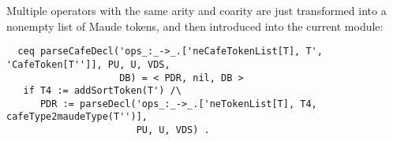 Multiple operators with the same arity and coarity are just transformed into a nonempty
list of Maude tokens, and then introduced into the current module:

{\codesize
\begin{verbatim}
  ceq parseCafeDecl('ops_:_->_.['neCafeTokenList[T], T', 'CafeToken[T'']], PU, U, VDS,
                    DB) = < PDR, nil, DB >
   if T4 := addSortToken(T') /\
      PDR := parseDecl('ops_:_->_.['neTokenList[T], T4, cafeType2maudeType(T'')],
                       PU, U, VDS) .
\end{verbatim}
}

{\codesize
\begin{comment}
  ceq parseCafeDecl('ops_:`->_`{_`}.['neCafeTokenList[T], 'CafeToken[T''], T'''],  PU, U,
                    VDS, DB) = < PDR, nil, DB >
   if PDR := parseDecl('ops_:`->_`[_`].['neTokenList[T], cafeType2maudeType(T''),
                                        map2MaudeAttr(T''')], PU, U, VDS) .

  ceq parseCafeDecl('ops_:`->_.['neCafeTokenList[T], 'CafeToken[T'']], PU, U, VDS, DB) =
                                                                          < PDR, nil, DB >
   if PDR := parseDecl('ops_:`->_.['neTokenList[T], cafeType2maudeType(T'')], PU, U, VDS) .

  ceq parseCafeDecl('bop_:_->_.['CafeToken[T], T', 'CafeToken[T'']],  PU, U, VDS, DB) =
                                                                          < PDR, nil, DB >
   if T4 := addSortToken(T') /\
      PDR := parseDecl('op_:_->_.['token[T], T4, cafeType2maudeType(T'')], PU, U, VDS) .

  ceq parseCafeDecl('bop_:_->_`{_`}.['CafeToken[T], T', 'CafeToken[T''], T'''], PU, U,
                    VDS, DB) = < PDR, nil, DB >
   if T4 := addSortToken(T') /\
      PDR := parseDecl('op_:_->_`[_`].['token[T], T4, cafeType2maudeType(T''),
                                       map2MaudeAttr(T''')], PU, U, VDS) .

  ceq parseCafeDecl('bops_:_->_.['neCafeTokenList[T], T', 'CafeToken[T'']], PU, U, VDS,
                    DB) = < PDR, nil, DB >
   if T4 := addSortToken(T') /\
      PDR := parseDecl('ops_:_->_.['neTokenList[T], T4, cafeType2maudeType(T'')], PU, U, VDS) .

  ceq parseCafeDecl('ops_:_->_`{_`}.['neCafeTokenList[T], T', 'CafeToken[T''], T'''], PU,
                    U, VDS, DB) = < PDR, nil, DB >
   if T4 := addSortToken(T') /\
      PDR := parseDecl('ops_:_->_`[_`].['neTokenList[T], T4, cafeType2maudeType(T''),
                                        map2MaudeAttr(T''')], PU, U, VDS) .
\end{comment}
}

